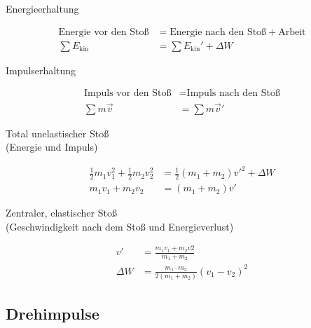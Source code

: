 \begin{boxleft}Energieerhaltung
\end{boxleft}\begin{boxrightshaded}
\begin{align}
\text{Energie vor den Stoß} &= \text{Energie nach den Stoß}+\text{Arbeit}\nonumber\\
\sum E_{\text{kin}}&=\sum E_{\text{kin}}'+\Delta W
\end{align}
\end{boxrightshaded}

\begin{boxleft}Impulserhaltung
\end{boxleft}\begin{boxrightshaded}
\begin{align}
\text{Impuls vor den Stoß} &= \text{Impuls nach den Stoß}\nonumber\\
\sum m\vec{v}&= \sum m\vec{v}'
\end{align}
\end{boxrightshaded}

\begin{boxleft}Total unelastischer Stoß\\
(Energie und Impuls)
\end{boxleft}\begin{boxrightshaded}
\begin{align}
\frac{1}{2}m_1v_1^2+\frac{1}{2}m_2v_2^2&=\frac{1}{2}\left(m_1+m_2\right)v'^2+\Delta W\\
m_1v_1+m_2v_2&=\left(m_1+m_2\right)v'
\end{align}
\end{boxrightshaded}

\begin{boxleft}Zentraler, elastischer Stoß\\
(Geschwindigkeit nach dem Stoß und Energieverlust)
\end{boxleft}\begin{boxrightshaded}
\begin{align}
v'		&=\frac{m_1v_1+m_2v2}{m_1+m_2}\\
\Delta W	&=\frac{m_1\cdot m_2}{2\left(m_1+m_2\right)}\left(v_1-v_2\right)^2
\end{align}
\end{boxrightshaded}

\subsection{Drehimpulse}

